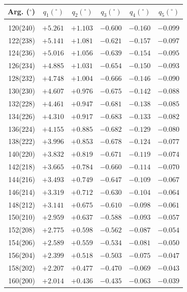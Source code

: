 \clearpage
\begin{table}[!h]
\vspace{0.25cm}
\centering
\begin{tabular}{rrrrrr}
Arg. ($^\circ$) & $q_1(^\circ)$  & $q_2(^\circ)$ & $q_3(^\circ)$ & $q_4(^\circ)$  & $q_5(^\circ)$  \\\hline
&&&&&\\[-1.75ex]
120(240) & $+5.261$ & $+1.103$ & $-0.600$ & $-0.160$ & $-0.099$\\
122(238) & $+5.141$ & $+1.081$ & $-0.621$ & $-0.157$ & $-0.097$\\
124(236) & $+5.016$ & $+1.056$ & $-0.639$ & $-0.154$ & $-0.095$\\
126(234) & $+4.885$ & $+1.031$ & $-0.654$ & $-0.150$ & $-0.093$\\
128(232) & $+4.748$ & $+1.004$ & $-0.666$ & $-0.146$ & $-0.090$\\
130(230) & $+4.607$ & $+0.976$ & $-0.675$ & $-0.142$ & $-0.088$\\
132(228) & $+4.461$ & $+0.947$ & $-0.681$ & $-0.138$ & $-0.085$\\
134(226) & $+4.310$ & $+0.917$ & $-0.683$ & $-0.133$ & $-0.082$\\
136(224) & $+4.155$ & $+0.885$ & $-0.682$ & $-0.129$ & $-0.080$\\
138(222) & $+3.996$ & $+0.853$ & $-0.678$ & $-0.124$ & $-0.077$\\
140(220) & $+3.832$ & $+0.819$ & $-0.671$ & $-0.119$ & $-0.074$\\
142(218) & $+3.665$ & $+0.784$ & $-0.660$ & $-0.114$ & $-0.070$\\
144(216) & $+3.493$ & $+0.749$ & $-0.647$ & $-0.109$ & $-0.067$\\
146(214) & $+3.319$ & $+0.712$ & $-0.630$ & $-0.104$ & $-0.064$\\
148(212) & $+3.141$ & $+0.675$ & $-0.610$ & $-0.098$ & $-0.061$\\
150(210) & $+2.959$ & $+0.637$ & $-0.588$ & $-0.093$ & $-0.057$\\
152(208) & $+2.775$ & $+0.598$ & $-0.562$ & $-0.087$ & $-0.054$\\
154(206) & $+2.589$ & $+0.559$ & $-0.534$ & $-0.081$ & $-0.050$\\
156(204) & $+2.399$ & $+0.518$ & $-0.503$ & $-0.075$ & $-0.047$\\
158(202) & $+2.207$ & $+0.477$ & $-0.470$ & $-0.069$ & $-0.043$\\
160(200) & $+2.014$ & $+0.436$ & $-0.435$ & $-0.063$ & $-0.039$\\

\end{tabular}
\end{table}
